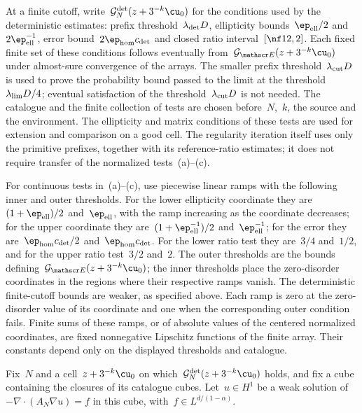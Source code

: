 \documentclass[11pt]{amsart}
\begin{document}
At a finite cutoff, write~$\mathcal G_N^{\rm det}(z+3^{-k}\cu_0)$ for the conditions used by the deterministic estimates: prefix threshold~$\lambda_{\rm det}D$, ellipticity bounds~$\ep_{\rm ell}/2$ and~$2\ep_{\rm ell}^{-1}$, error bound~$2\ep_{\rm hom}c_{\rm det}$ and closed ratio interval~$[\nf12,2]$. Each fixed finite set of these conditions follows eventually from~$\mathcal G_{\mathscr E}(z+3^{-k}\cu_0)$ under almost-sure convergence of the arrays. The smaller prefix threshold~$\lambda_{\rm cut}D$ is used to prove the probability bound passed to the limit at the threshold~$\lambda_{\rm lim}D/4$; eventual satisfaction of the threshold~$\lambda_{\rm cut}D$ is not needed. The catalogue and the finite collection of tests are chosen before~$N$,~$k$, the source and the environment. The ellipticity and matrix conditions of these tests are used for extension and comparison on a good cell. The regularity iteration itself uses only the primitive prefixes, together with its reference-ratio estimates; it does not require transfer of the normalized tests~(a)--(c).

\smallskip

For continuous tests in~(a)--(c), use piecewise linear ramps with the following inner and outer thresholds. For the lower ellipticity coordinate they are~$(1+\ep_{\rm ell})/2$ and~$\ep_{\rm ell}$, with the ramp increasing as the coordinate decreases; for the upper coordinate they are~$(1+\ep_{\rm ell}^{-1})/2$ and~$\ep_{\rm ell}^{-1}$; for the error they are~$\ep_{\rm hom}c_{\rm det}/2$ and~$\ep_{\rm hom}c_{\rm det}$. For the lower ratio test they are~$3/4$ and~$1/2$, and for the upper ratio test~$3/2$ and~$2$. The outer thresholds are the bounds defining~$\mathcal G_{\mathscr E}(z+3^{-k}\cu_0)$; the inner thresholds place the zero-disorder coordinates in the regions where their respective ramps vanish. The deterministic finite-cutoff bounds are weaker, as specified above. Each ramp is zero at the zero-disorder value of its coordinate and one when the corresponding outer condition fails. Finite sums of these ramps, or of absolute values of the centered normalized coordinates, are fixed nonnegative Lipschitz functions of the finite array. Their constants depend only on the displayed thresholds and catalogue.

Fix~$N$ and a cell~$z+3^{-k}\cu_0$ on which~$\mathcal G_N^{\rm det}(z+3^{-k}\cu_0)$ holds, and fix a cube containing the closures of its catalogue cubes. Let~$u\in H^1$ be a weak solution of~$-\nabla\cdot(A_N\nabla u)=f$ in this cube, with~$f\in L^{d/(1-\alpha)}$.
\end{document}
